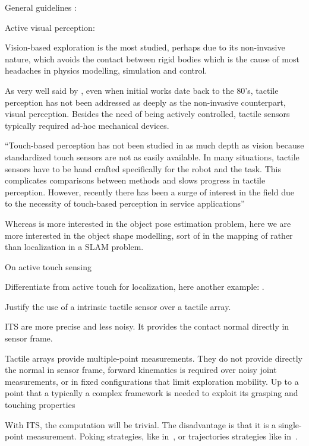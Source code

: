 
General guidelines : \citet{Bajcsy1989Machine}

Active visual perception: \citet{Bajcsy1988Active}

Vision-based exploration is the most studied, perhaps due to its non-invasive nature, which avoids the contact between rigid bodies which is the cause of most headaches in physics modelling, simulation and control.

As very well said by \citet{Petrovskaya2011Global}, even when initial works date back to the 80's, tactile perception has not been addressed as deeply as the non-invasive counterpart, visual perception. Besides the need of being actively controlled, tactile sensors typically required ad-hoc mechanical devices.

``Touch-based perception has not been studied in as much depth
as vision because standardized touch sensors are not as easily
available. In many situations, tactile sensors have to be hand
crafted specifically for the robot and the task. This complicates
comparisons between methods and slows progress in tactile
perception. However, recently there has been a surge of interest
in the field due to the necessity of touch-based perception in
service applications''

Whereas \citet{Petrovskaya2011Global} is more interested in the object pose estimation problem, here we are more interested in the object shape modelling, sort of in the mapping of rather than localization in a SLAM problem.

On active touch sensing \citet{Prescott2011Active}

Differentiate from active touch for localization, here another example: \citet{Hebert2013Next}.

Justify the use of a intrinsic tactile sensor over a tactile array.

ITS are more precise and less noisy. It provides the contact normal directly in sensor frame.

Tactile arrays provide multiple-point measurements. They do not provide directly the normal in sensor frame, forward kinematics is required over noisy joint measurements, or in fixed configurations that limit exploration mobility. Up to a point that a typically a complex framework is needed to exploit its grasping and touching properties %

With ITS, the computation will be trivial. The disadvantage is that it is a single-point measurement. Poking strategies, like in~\citet{Petrovskaya2011Global}, or trajectories strategies like in~\citet{Rosales2014Active}.


